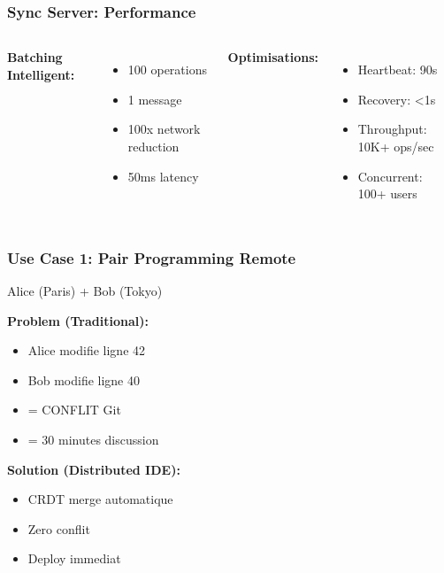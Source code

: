 \documentclass[aspectratio=16:9]{beamer}
\begin{document}
\begin{frame}
  \frametitle{Sync Server: Performance}
  
  \begin{columns}
    
    \textbf{Batching Intelligent:}
    \begin{itemize}
      \item 100 operations
      \item 1 message
      \item 100x network reduction
      \item 50ms latency
    \end{itemize}
    
    
    \textbf{Optimisations:}
    \begin{itemize}
      \item Heartbeat: 90s
      \item Recovery: <1s
      \item Throughput: 10K+ ops/sec
      \item Concurrent: 100+ users
    \end{itemize}
  \end{columns}
\end{frame}

\begin{frame}
  \frametitle{Use Case 1: Pair Programming Remote}
  
  \centering
  
  Alice (Paris) + Bob (Tokyo)
  
  \vspace{0.5cm}
  
  \textbf{Problem (Traditional):}
  \begin{itemize}
    \item Alice modifie ligne 42
    \item Bob modifie ligne 40
    \item = CONFLIT Git
    \item = 30 minutes discussion
  \end{itemize}
  
  \vspace{0.5cm}
  
  \textbf{Solution (Distributed IDE):}
  \begin{itemize}
    \item CRDT merge automatique
    \item Zero conflit
    \item Deploy immediat
  \end{itemize}
\end{frame}
\end{document}
